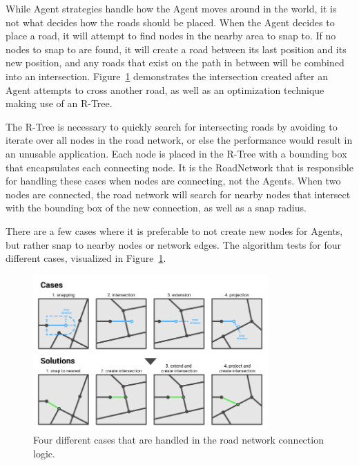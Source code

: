 
While Agent strategies handle how the Agent moves around in the world, it is not what decides how the roads should be placed.
When the Agent decides to place a road, it will attempt to find nodes in the nearby area to snap to.
If no nodes to snap to are found, it will create a road between its last position and its new position, and any roads that exist on the path in between will be combined into an intersection.
Figure~\ref{fig:road_connection_cases} demonstrates the intersection created after an Agent attempts to cross another road, as well as an optimization technique making use of an R-Tree. %

The R-Tree is necessary to quickly search for intersecting roads by avoiding to iterate over all nodes in the road network, or else the performance would result in an unusable application.
Each node is placed in the R-Tree with a bounding box that encapsulates each connecting node.
It is the RoadNetwork that is responsible for handling these cases when nodes are connecting, not the Agents.
When two nodes are connected, the road network will search for nearby nodes that intersect with the bounding box of the new connection, as well as a snap radius.

There are a few cases where it is preferable to not create new nodes for Agents, but rather snap to nearby nodes or network edges.
The algorithm tests for four different cases, visualized in Figure~\ref{fig:road_connection_cases}.

\begin{figure}[H]
  \centering

  \includegraphics[width=0.8\textwidth]{figure/road_connection_cases.png}
  \caption{Four different cases that are handled in the road network connection logic.}

  \label{fig:road_connection_cases}
\end{figure}

